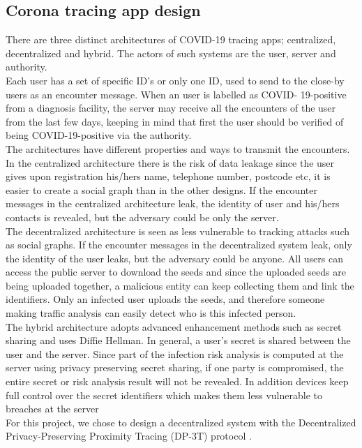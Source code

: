 \documentclass[a4paper, twocolumn]{article}
\begin{document}
\subsection{Corona tracing app design}
There are three distinct architectures of COVID-19 tracing apps; centralized, decentralized and hybrid. The actors of such systems are the user, server and authority.\\
Each user has a set of specific ID’s or only one ID, used to send to the close-by users as an encounter message. 
When an user is labelled as COVID- 19-positive from a diagnosis facility, the server may receive all the encounters of the user from the last few days, keeping in mind that first the user should be verified of being COVID-19-positive via the authority.\\
The architectures have different properties and ways to transmit the encounters.\\
In the centralized architecture there is the risk of data leakage since the user gives upon registration his/hers name, telephone number, postcode etc, it is easier to create a social graph than in the other designs. If the encounter messages in the centralized architecture leak, the identity of user and his/hers contacts is revealed, but the adversary could be only the server.\\ 
The decentralized architecture is seen as less vulnerable to tracking attacks such as social graphs. If the encounter messages in the decentralized system leak, only the identity of the user leaks, but the adversary could be anyone. All users can access the public server to download the seeds and since the uploaded seeds are being uploaded together, a malicious entity can keep collecting them and link the identifiers. Only an infected user uploads the seeds, and therefore someone making traffic analysis can easily detect who is this infected person.\\
The hybrid architecture adopts advanced enhancement methods such as secret sharing and uses Diffie Hellman. In general, a user’s secret is shared between the user and the server. Since part of the infection risk analysis is computed at the server using privacy preserving secret sharing, if one party is compromised, the entire secret or risk analysis result will not be revealed. In addition devices keep full control over the secret identifiers which makes them less vulnerable to breaches at the server\\

\noindent For this project, we chose to design a decentralized system with the Decentralized Privacy-Preserving Proximity Tracing (DP-3T) protocol \cite{dp3t-white}\cite{dp3t}.\\
\end{document}
